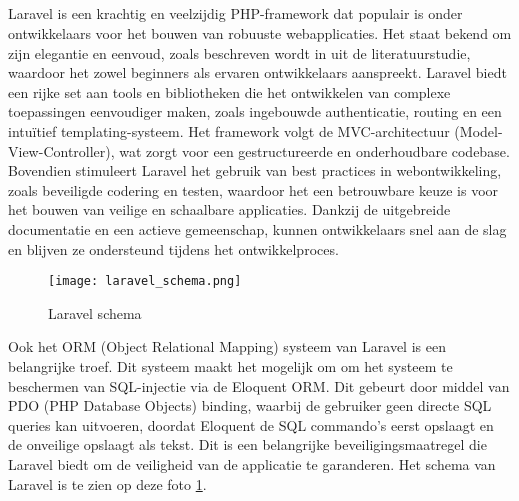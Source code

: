 \subsection{}
Laravel is een krachtig en veelzijdig PHP-framework dat populair is onder ontwikkelaars voor het bouwen van robuuste 
webapplicaties. Het staat bekend om zijn elegantie en eenvoud, zoals beschreven wordt in  
uit de literatuurstudie, waardoor het zowel beginners als ervaren ontwikkelaars 
aanspreekt. Laravel biedt een rijke set aan tools en bibliotheken die het ontwikkelen van complexe toepassingen eenvoudiger 
maken, zoals ingebouwde authenticatie, routing en een intuïtief templating-systeem. Het framework volgt de MVC-architectuur 
(Model-View-Controller), wat zorgt voor een gestructureerde en onderhoudbare codebase. Bovendien stimuleert Laravel het 
gebruik van best practices in webontwikkeling, zoals beveiligde codering en testen, waardoor het een betrouwbare keuze is 
voor het bouwen van veilige en schaalbare applicaties. Dankzij de uitgebreide documentatie en een actieve gemeenschap, kunnen 
ontwikkelaars snel aan de slag en blijven ze ondersteund tijdens het ontwikkelproces.

\begin{figure}
    \centering
    \texttt{[image: laravel\_schema.png]}
    \caption[Laravel schema]{Laravel schema}
    \label{fig:laravel_schema}
\end{figure}

Ook het ORM (Object Relational Mapping) systeem van Laravel is een belangrijke troef. Dit systeem maakt het mogelijk om 
om het systeem te beschermen van SQL-injectie via de Eloquent ORM. Dit gebeurt door middel van PDO (PHP Database Objects) binding, waarbij de
gebruiker geen directe SQL queries kan uitvoeren, doordat Eloquent de SQL commando's eerst opslaagt en de onveilige opslaagt 
als tekst. Dit is een belangrijke beveiligingsmaatregel die Laravel biedt om de veiligheid van de applicatie te garanderen.
Het schema van Laravel is te zien op deze foto \ref{fig:laravel_schema}.


\section{}

